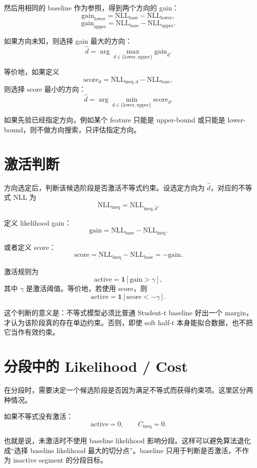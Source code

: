 \documentclass[11pt]{ctexart}
\begin{document}
然后用相同的 baseline 作为参照，得到两个方向的 gain：
\[
 \mathrm{gain}_{\mathrm{lower}}
 =
 \mathrm{NLL}_{\mathrm{base}}-\mathrm{NLL}_{\mathrm{lower}},
\]
\[
 \mathrm{gain}_{\mathrm{upper}}
 =
 \mathrm{NLL}_{\mathrm{base}}-\mathrm{NLL}_{\mathrm{upper}}.
\]

如果方向未知，则选择 gain 最大的方向：
\[
 \hat d
 =
 \arg\max_{d\in\{\mathrm{lower},\mathrm{upper}\}}
 \mathrm{gain}_d.
\]

等价地，如果定义
\[
 \mathrm{score}_d
 =
 \mathrm{NLL}_{\mathrm{ineq},d}-\mathrm{NLL}_{\mathrm{base}},
\]
则选择 score 最小的方向：
\[
 \hat d
 =
 \arg\min_{d\in\{\mathrm{lower},\mathrm{upper}\}}
 \mathrm{score}_d.
\]

如果先验已经指定方向，例如某个 feature 只能是 upper-bound 或只能是 lower-bound，则不做方向搜索，只评估指定方向。

\section{激活判断}

方向选定后，判断该候选阶段是否激活不等式约束。设选定方向为 $\hat d$，对应的不等式 NLL 为
\[
 \mathrm{NLL}_{\mathrm{ineq}}
 =
 \mathrm{NLL}_{\mathrm{ineq},\hat d}.
\]

定义 likelihood gain：
\[
 \mathrm{gain}
 =
 \mathrm{NLL}_{\mathrm{base}}-\mathrm{NLL}_{\mathrm{ineq}}.
\]

或者定义 score：
\[
 \mathrm{score}
 =
 \mathrm{NLL}_{\mathrm{ineq}}-\mathrm{NLL}_{\mathrm{base}}
 = -\mathrm{gain}.
\]

激活规则为
\[
 \mathrm{active}
 =
 \mathbf{1}\left[\mathrm{gain}>\gamma\right],
\]
其中 $\gamma$ 是激活阈值。等价地，若使用 score，则
\[
 \mathrm{active}
 =
 \mathbf{1}\left[\mathrm{score}< -\gamma\right].
\]

这个判断的意义是：不等式模型必须比普通 Student-t baseline 好出一个 margin，才认为该阶段真的存在单边约束。否则，即使 soft half-t 本身能拟合数据，也不把它当作有效约束。

\section{分段中的 Likelihood / Cost}

在分段时，需要决定一个候选阶段是否因为满足不等式而获得约束项。这里区分两种情况。

如果不等式没有激活：
\[
 \mathrm{active}=0,
 \qquad
 C_{\mathrm{ineq}}=0.
\]

也就是说，未激活时不使用 baseline likelihood 影响分段。这样可以避免算法退化成“选择 baseline likelihood 最大的切分点”。baseline 只用于判断是否激活，不作为 inactive segment 的分段目标。
\end{document}
